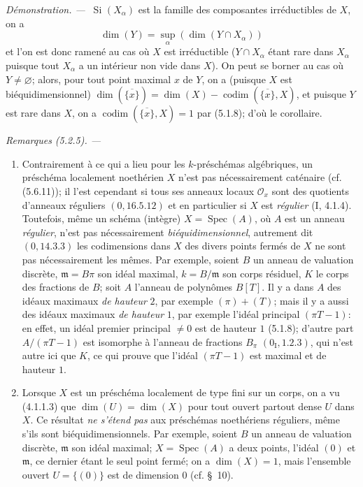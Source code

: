 \documentclass[10pt,oneside]{book}
\newenvironment{remarks}[1][]{%
  \par\medskip\noindent\itshape Remarques (#1). ---\ }{\par}
\newenvironment{proof}{%
  \par\medskip\noindent\textit{Démonstration. ---\ }}{\par}
\begin{document}
\begin{proof}
Si $(X_\alpha)$ est la famille des composantes irréductibles de $X$, on a
\[
\dim(Y)=\sup_\alpha(\dim(Y\cap X_\alpha))
\]
et l'on est donc ramené au cas où $X$ est irréductible ($Y\cap X_\alpha$
étant rare dans $X_\alpha$ puisque tout $X_\alpha$ a un intérieur non vide
dans $X$). On peut se borner au cas où $Y\ne\varnothing$; alors, pour tout
point maximal $x$ de $Y$, on a (puisque $X$ est biéquidimensionnel)
$\dim(\overline{\{x\}})=\dim(X)-\operatorname{codim}(\overline{\{x\}},X)$,
et puisque $Y$ est rare dans $X$, on a
$\operatorname{codim}(\overline{\{x\}},X)=1$ par (5.1.8); d'où le corollaire.
\end{proof}

\begin{remarks}[5.2.5]
\label{IV.2.5.2.5-fr}
\begin{enumerate}
\item[(i)] Contrairement à ce qui a lieu pour les $k$-préschémas algébriques,
un préschéma localement noethérien $X$ n'est pas nécessairement caténaire
(cf. (5.6.11)); il l'est cependant si tous ses anneaux locaux $\mathcal O_x$
sont des quotients d'anneaux réguliers $(0,16.5.12)$ et en particulier si $X$
est \emph{régulier} (I, 4.1.4). Toutefois, même un schéma (intègre)
$X=\operatorname{Spec}(A)$, où $A$ est un anneau \emph{régulier}, n'est pas
nécessairement \emph{biéquidimensionnel}, autrement dit $(0,14.3.3)$ les
codimensions dans $X$ des divers points fermés de $X$ ne sont pas
nécessairement les mêmes. Par exemple, soient $B$ un anneau de valuation
discrète, $\mathfrak m=B\pi$ son idéal maximal, $k=B/\mathfrak m$ son corps
résiduel, $K$ le corps des fractions de $B$; soit $A$ l'anneau de polynômes
$B[T]$. Il y a dans $A$ des idéaux maximaux \emph{de hauteur} $2$, par exemple
$(\pi)+(T)$; mais il y a aussi des idéaux maximaux \emph{de hauteur} $1$, par
exemple l'idéal principal $(\pi T-1)$: en effet, un idéal premier principal
$\ne0$ est de hauteur $1$ (5.1.8); d'autre part
$A/(\pi T-1)$ est isomorphe à l'anneau de fractions $B_\pi$
$(0_{\mathrm I},1.2.3)$, qui n'est autre ici que $K$, ce qui prouve que
l'idéal $(\pi T-1)$ est maximal et de hauteur $1$.

\item[(ii)] Lorsque $X$ est un préschéma localement de type fini sur un corps,
on a vu (4.1.1.3) que $\dim(U)=\dim(X)$ pour tout ouvert partout dense $U$
dans $X$. Ce résultat \emph{ne s'étend pas} aux préschémas noethériens
réguliers, même s'ils sont biéquidimensionnels. Par exemple, soient $B$ un
anneau de valuation discrète, $\mathfrak m$ son idéal maximal;
$X=\operatorname{Spec}(A)$ a deux points, l'idéal $(0)$ et $\mathfrak m$, ce
dernier étant le seul point fermé; on a $\dim(X)=1$, mais l'ensemble ouvert
$U=\{(0)\}$ est de dimension $0$ (cf. \S~10).
\end{enumerate}
\end{remarks}
\end{document}
